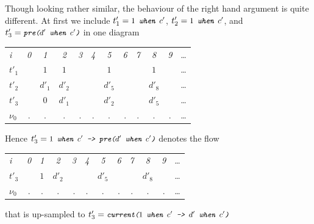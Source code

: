 {Though looking rather similar, the behaviour of the right hand argument is
quite different. At first we include $t'_{1} = \emph{\texttt{\small{$1$ when $c'$}}}$, 
$t'_{2} = \emph{\texttt{\small{$1$ when $c'$}}}$, and $t'_{3} = \emph{\texttt{\small{pre($d'$ when $c'$)}}}$ in one diagram
\begin{center}
  \leavevmode
  \begin{tabular}[]{l@{\quad}||@{\quad} ccccccccccc}
    \hline\hline  
     \hbox{{\footnotesize \textit{i}}} &{\footnotesize \textit{0}}
     &{\footnotesize \textit{1}}&{\footnotesize \textit{2}}
     &{\footnotesize \textit{3}}&{\footnotesize \textit{4}}
     &{\footnotesize \textit{5}}&{\footnotesize \textit{6}}
     &{\footnotesize \textit{7}}&{\footnotesize \textit{8}}
     &{\footnotesize \textit{9}}&\ldots
   \\      
    \hbox{$t'_{1}$} 
    &&$1$&$1$&&&$1$&&&$1$&&\ldots
   \\
    \hbox{$t'_{2}$} 
    &&$d'_1$&$d'_2$&&&$d'_5$&&&$d'_8$&&\ldots
   \\
    \hbox{$t'_{3}$} 
    &&$0$&$d'_1$&&&$d'_2$&&&$d'_5$&&\ldots
   \\
    \hbox{$\nu_{0}$}  &.&.&.&.&.&.&.&.&.&.&\ldots
   \\
   \hline\hline
  \end{tabular}
\end{center}
Hence $t'_{3} = \emph{\texttt{\small{$1$ when $c'$ -> pre($d'$ when $c'$)}}}$ denotes the
flow
\begin{center}
  \leavevmode
  \begin{tabular}[]{l@{\quad}||@{\quad} ccccccccccc}
    \hline\hline  
     \hbox{{\footnotesize \textit{i}}} &{\footnotesize \textit{0}}
     &{\footnotesize \textit{1}}&{\footnotesize \textit{2}}
     &{\footnotesize \textit{3}}&{\footnotesize \textit{4}}
     &{\footnotesize \textit{5}}&{\footnotesize \textit{6}}
     &{\footnotesize \textit{7}}&{\footnotesize \textit{8}}
     &{\footnotesize \textit{9}}&\ldots
   \\      
    \hbox{$t'_{3}$} 
    &&$1$&$d'_2$&&&$d'_5$&&&$d'_8$&&\ldots
   \\
    \hbox{$\nu_{0}$}  &.&.&.&.&.&.&.&.&.&.&\ldots
   \\
   \hline\hline
  \end{tabular}
\end{center}
that is up-sampled to $t'_{3} = \emph{\texttt{\small{current($1$ when $c'$ -> $d'$ when $c'$)}}}$
\begin{center}
  \leavevmode
  \begin{tabular}[]{l@{\quad}||@{\quad} ccccccccccc}

\end{tabular}
\end{center}}
